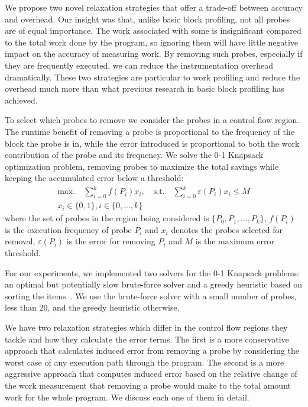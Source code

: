     We propose two novel relaxation strategies that offer a trade-off between accuracy and overhead. Our insight was that, unlike basic
    block profiling, not all probes are of equal importance. The work associated with some is insignificant compared to the total work
    done by the program, so ignoring them will have little negative impact on the accuracy of measuring work. By removing such probes,
    especially if they are frequently executed, we can reduce the instrumentation overhead dramatically. These two strategies are
    particular to work profiling and reduce the overhead much more than what previous research in basic block profiling has achieved.

    To select which probes to remove we consider the probes in a control flow region. The runtime benefit of removing a probe is
    proportional to the frequency of the block the probe is in, while the error introduced is proportional to both the work contribution of
    the probe and its frequency. We solve the 0-1 Knapsack optimization problem, removing probes to maximize the total savings while
    keeping the accumulated error below a threshold:
    \begin{gather*}
        \textrm{max.}\quad\sum_{i=0}^{k} f(P_i)x_i,\quad
        \textrm{s.t.}\quad\sum_{i=0}^{k} \varepsilon(P_i)x_i \leq M \\
        x_i\in\{0,1\}, i\in\{0,\ldots,k\}
    \end{gather*}
    where the set of probes in the region being considered is $\{P_0, P_1, \ldots, P_k\}$, $f(P_i)$ is the execution frequency of probe
    $P_i$ and $x_i$ denotes the probes selected for removal, $\varepsilon(P_i)$ is the error for removing $P_i$ and $M$ is the maximum
    error threshold.

    For our experiments, we implemented two solvers for the 0-1 Knapsack problems: an optimal but potentially slow brute-force solver and a
    greedy heuristic based on sorting the items~\cite{dantzig57}. We use the brute-force solver with a small number of probes, less than
    20, and the greedy heuristic otherwise.

    We have two relaxation strategies which differ in the control flow regions they tackle and how they calculate the error terms. The
    first is a more conservative approach that calculates induced error from removing a probe by considering the worst case of any
    execution path through the program. The second is a more aggressive approach that computes induced error based on the relative change
    of the work measurement that removing a probe would make to the total amount work for the whole program. We discuss each one of them
    in detail.

